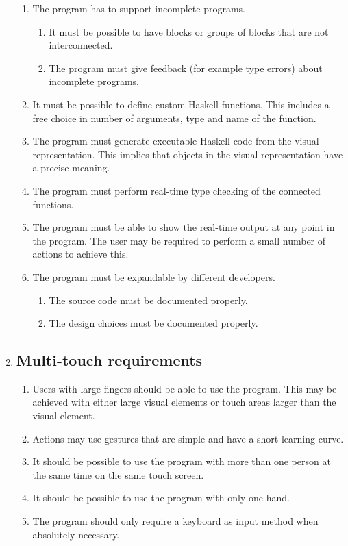 \begin{enumerate}
\begin{enumerate}
	\item The program has to support incomplete programs.
	\begin{enumerate}
		\item It must be possible to have blocks or groups of blocks that are not interconnected.
		\item The program must give feedback (for example type errors) about incomplete programs.
	\end{enumerate}
	\item It must be possible to define custom Haskell functions. This includes a free choice in number of arguments, type and name of the function.
	\item The program must generate executable Haskell code from the visual representation. This implies that objects in the visual representation have a precise meaning.
	\item The program must perform real-time type checking of the connected functions.
	\item The program must be able to show the real-time output at any point in the program. The user may be required to perform a small number of actions to achieve this.
	\item The program must be expandable by different developers.
	\begin{enumerate}
		\item The source code must be documented properly.
		\item The design choices must be documented properly.
	\end{enumerate}
\end{enumerate}

\item \subsection*{Multi-touch requirements} 

\begin{enumerate}
	\item Users with large fingers should be able to use the program. This may be achieved with either large visual elements or touch areas larger than the visual element.
	\item Actions may use gestures that are simple and have a short learning curve.
	\item It should be possible to use the program with more than one person at the same time on the same touch screen.
	\item It should be possible to use the program with only one hand.
	\item The program should only require a keyboard as input method when absolutely necessary.
\end{enumerate}

\end{enumerate}
